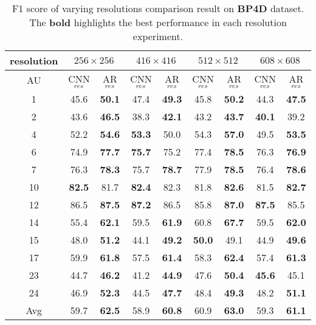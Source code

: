 \documentclass[5p,twocolumn]{elsarticle}
\begin{document}
\begin{table}
	\scriptsize
	\centering
	
	\setlength{\abovecaptionskip}{0pt} 
	
	\caption{F1 score of varying resolutions comparison result on \textbf{BP4D} dataset. The \textbf{bold} highlights the best performance in each resolution experiment.}
	\label{tab:BP4D_resolution}
	\centering
	\tabcolsep=0.05cm
	\begin{tabular}{ccc @{\hspace{5\tabcolsep}} cc @{\hspace{5\tabcolsep}} cc @{\hspace{5\tabcolsep}} cc}
		
		\toprule
		resolution & \multicolumn{2}{c}{$256 \times 256$} & \multicolumn{2}{c}{$416 \times 416$} & \multicolumn{2}{c}{$512 \times 512$} & \multicolumn{2}{c}{$608 \times 608$} \\
		\midrule
		AU & CNN$_{res}$ & AR$_{res}$ & CNN$_{res}$ & AR$_{res}$ & CNN$_{res}$ & AR$_{res}$ & CNN$_{res}$ & AR$_{res}$ \\
		\midrule
		1 & 45.6 & \textbf{50.1} & 47.4 & \textbf{49.3} & 45.8 & \textbf{50.2} & 44.3 & \textbf{47.5} \\
		2 & 43.6 & \textbf{46.5} & 38.3 & \textbf{42.1} & 43.2 & \textbf{43.7} & \textbf{40.1} & 39.2 \\
		4 & 52.2 & \textbf{54.6} & \textbf{53.3} & 50.0 & 54.3 & \textbf{57.0} & 49.5 & \textbf{53.5} \\ 
		6 & 74.9 & \textbf{77.7} & \textbf{75.7} & 75.2 & 77.4 & \textbf{78.5} & 76.3 & \textbf{76.9} \\
		7 & 76.3 & \textbf{78.3} & 75.7 & \textbf{78.7} & 77.9 & \textbf{78.5} & 76.4 & \textbf{78.6} \\
		10 & \textbf{82.5} & 81.7 & \textbf{82.4} & 82.3 & 81.8 & \textbf{82.6} & 81.5 & \textbf{82.7} \\
		12 & 86.5 & \textbf{87.5} & \textbf{87.2} & 86.5 & 85.8 & \textbf{87.0} & \textbf{87.5} & 85.5 \\
		14 & 55.4 & \textbf{62.1} & 59.5 & \textbf{61.9} & 60.8 & \textbf{67.7} & 59.5 & \textbf{62.0} \\
		15 & 48.0 & \textbf{51.2} & 44.1 & \textbf{49.2} & \textbf{50.0} & 49.1 & 44.9 & \textbf{49.6} \\
		17 & 59.9 & \textbf{61.8} & 57.5 & \textbf{61.4} & 58.3 & \textbf{62.4} & 57.4 & \textbf{61.3} \\
		23 & 44.7 & \textbf{46.2} & 41.2 & \textbf{44.9} & 47.6 & \textbf{50.4} & \textbf{45.6} & 45.1 \\
		24 & 46.9 & \textbf{52.3} & 44.5 & \textbf{47.7} & 48.4 & \textbf{49.3} & 48.2 & \textbf{51.1} \\
		\midrule
		Avg & 59.7 & \textbf{62.5} & 58.9 & \textbf{60.8} & 60.9 & \textbf{63.0} & 59.3 & \textbf{61.1} \\
		\bottomrule
	\end{tabular}
	\vspace{-0.5cm}
\end{table}
\end{document}
